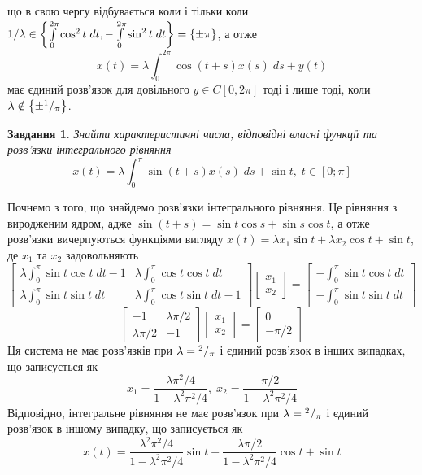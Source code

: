\documentclass[10pt]{article}
\newtheorem{prob}{Завдання}
\newcommand{\ds}{\;ds}
\newcommand{\dt}{\;dt}
\begin{document}
		що в свою чергу відбувається коли і тільки коли $1/\lambda\in\mycbra{
		\int_0^{2\pi}\cos^2t\dt,-\int_0^{2\pi}\sin^2t\dt}=\mycbra{\pm\pi}$, а отже
		\[x(t)=\lambda\int_0^{2\pi}\cos(t+s)x(s)\ds+y(t)\]
		має
		єдиний розв’язок для довільного $y\in C[0,2\pi]$ тоді і лише тоді, коли $\lambda\notin\left\{\pm{^{1}/_{\pi}}\right\}$.
\begin{prob}
	Знайти характеристичні числа, відповідні власні функції та розв’язки інтегрального рівняння
	\[x(t)=\lambda\int_{0}^{\pi}\sin(t+s) x(s)\ds+\sin t,\;t\in[0;\pi]\]
\end{prob}
	Почнемо з того, що знайдемо розв’язки інтегрального рівняння. Це рівняння з виродженим ядром, адже $\sin(t+s)=\sin t\cos s+
	\sin s\cos t$, а отже розв’язки вичерпуються функціями вигляду
	$x(t)=\lambda x_1\sin t+\lambda x_2\cos t+\sin t$, де $x_1$ та $x_2$ задовольняють
	\[\begin{bmatrix}
		\lambda\int_0^\pi \sin t\cos t\dt-1 & \lambda\int_0^\pi\cos t\cos t\dt\\
		\lambda\int_0^\pi \sin t\sin t\dt & \lambda\int_0^\pi\cos t\sin t\dt-1
	\end{bmatrix}
	\begin{bmatrix}x_1\\x_2\end{bmatrix}=\begin{bmatrix}-\int_0^\pi\sin t\cos t\dt\\
		-\int_0^\pi\sin t\sin t\dt\end{bmatrix}\]
	\[\begin{bmatrix}
		-1&\lambda\pi/2\\
		\lambda\pi/2&-1
	\end{bmatrix}
	\begin{bmatrix}x_1\\x_2\end{bmatrix}=\begin{bmatrix}0\\-\pi/2\end{bmatrix}\]
	Ця система не має розв’язків при $\lambda={^{2}/_{\pi}}$ і єдиний розв’язок в інших випадках, що записується як
	\[x_1=\frac{\lambda\pi^2/4}{1-\lambda^2\pi^2/4},\;x_2=\frac{\pi/2}{1-\lambda^2\pi^2/4}\]
	Відповідно, інтегральне рівняння не має розв’язок при $\lambda={^{2}/_{\pi}}$ і єдиний розв’язок в іншому випадку, що
	записується як
	\[x(t)=\frac{\lambda^2\pi^2/4}{1-\lambda^2\pi^2/4}\sin t+\frac{\lambda\pi/2}{1-\lambda^2\pi^2/4}\cos t+\sin t\]
\end{document}
